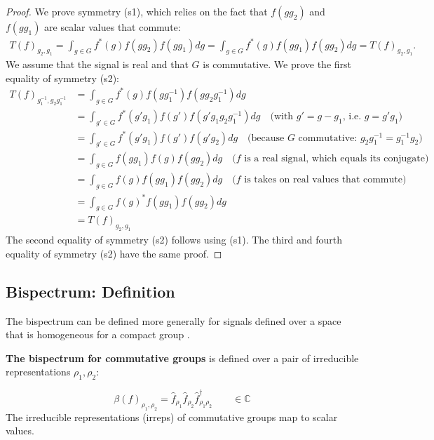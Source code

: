 \documentclass{article}
\begin{document}
\begin{proof}
    We prove symmetry (s1), which relies on the fact that $f(gg_2)$ and $f(gg_1)$ are scalar values that commute:
    \begin{align*}
        T(f)_{g_2, g_1}
            = \int_{g \in G}  f^*(g)f(gg_2)f(gg_1) dg
            = \int_{g \in G}  f^*(g)f(gg_1)f(gg_2) dg
            = T(f)_{g_2, g_1}.
    \end{align*}
    We assume that the signal is real and that $G$ is commutative.
    We prove the first equality of symmetry (s2):
    \begin{align*}
        T(f)_{g^{-1}_1, g_2g^{-1}_1}
            &= \int_{g \in G} f^*(g)f(gg^{-1}_1)f(gg_2g^{-1}_1) dg\\
            &= \int_{g' \in G} f^*(g'g_1)f(g')f(g'g_1g_2g^{-1}_1) dg
                \quad \text{(with $g' = g - g_1$, i.e. $g = g'g_1$)} \\
            &= \int_{g' \in G} f^*(g'g_1)f(g')f(g'g_2) dg
                \quad \text{(because $G$ commutative: $g_2 g^{-1}_1 = g^{-1}_1 g_2$)} \\
            &= \int_{g \in G}  f(gg_1)f(g)f(gg_2) dg
                \quad \text{($f$ is a real signal, which equals its conjugate)}\\
            &= \int_{g \in G}  f(g)f(gg_1)f(gg_2) dg
                \quad \text{($f$ is takes on real values that commute)}\\
            &= \int_{g \in G}  f(g)^*f(gg_1)f(gg_2) dg\\
            &= T(f)_{g_2, g_1}
    \end{align*}
    The second equality of symmetry (s2) follows using (s1).
    The third and fourth equality of symmetry (s2) have the same proof.
\end{proof}

\subsection{Bispectrum: Definition}

The bispectrum can be defined more generally for signals defined over a space that is homogeneous for a compact group \cite{kakarala2012bispectrum}.

\textbf{The bispectrum for commutative groups} is defined over a pair of irreducible representations $\rho_1, \rho_2$:

\begin{equation}
    \beta (f)_{\rho_1, \rho_2} = \hat{f}_{\rho_1}\hat{f}_{\rho_2}\hat{f}_{\rho_1 \rho_2}^{\dagger} \qquad \in \mathbb{C}
    \label{eqn:group-bs}
\end{equation}
The irreducible representations (irreps) of commutative groups map to scalar values.
\end{document}
